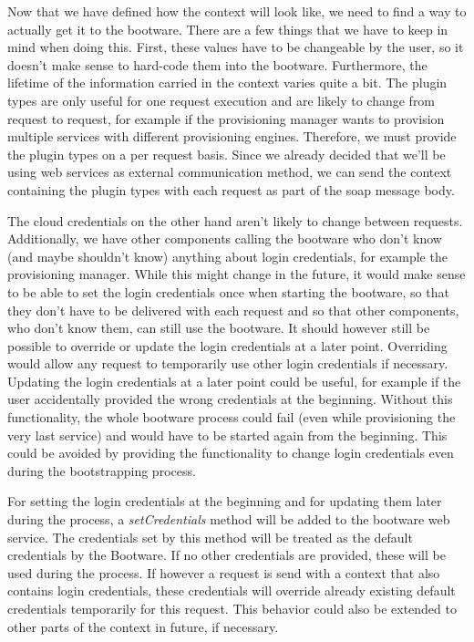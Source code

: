 Now that we have defined how the context will look like, we need to find a way to actually get it to the bootware.
There are a few things that we have to keep in mind when doing this.
First, these values have to be changeable by the user, so it doesn't make sense to hard-code them into the bootware.
Furthermore, the lifetime of the information carried in the context varies quite a bit.
The plugin types are only useful for one request execution and are likely to change from request to request, for example if the provisioning manager wants to provision multiple services with different provisioning engines.
Therefore, we must provide the plugin types on a per request basis.
Since we already decided that we'll be using web services as external communication method, we can send the context containing the plugin types with each request as part of the soap message body.

The cloud credentials on the other hand aren't likely to change between requests.
Additionally, we have other components calling the bootware who don't know (and maybe shouldn't know) anything about login credentials, for example the provisioning manager.
While this might change in the future, it would make sense to be able to set the login credentials once when starting the bootware, so that they don't have to be delivered with each request and so that other components, who don't know them, can still use the bootware.
It should however still be possible to override or update the login credentials at a later point.
Overriding would allow any request to temporarily use other login credentials if necessary.
Updating the login credentials at a later point could be useful, for example if the user accidentally provided the wrong credentials at the beginning.
Without this functionality, the whole bootware process could fail (even while provisioning the very last service) and would have to be started again from the beginning.
This could be avoided by providing the functionality to change login credentials even during the bootstrapping process.

For setting the login credentials at the beginning and for updating them later during the process, a \textit{setCredentials} method will be added to the bootware web service.
The credentials set by this method will be treated as the default credentials by the Bootware.
If no other credentials are provided, these will be used during the process.
If however a request is send with a context that also contains login credentials, these credentials will override already existing default credentials temporarily for this request.
This behavior could also be extended to other parts of the context in future, if necessary.
